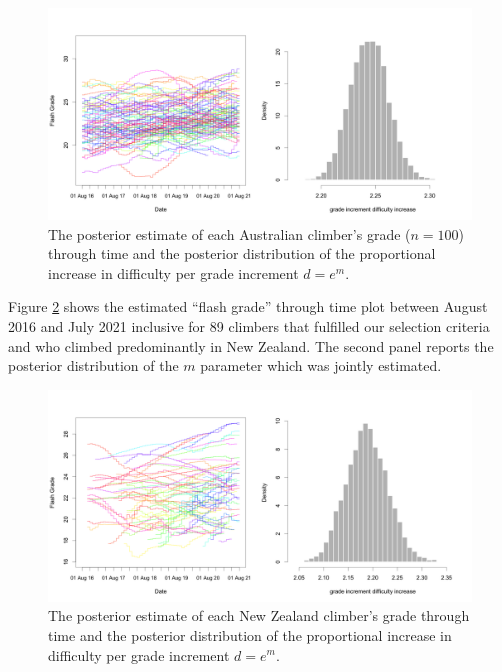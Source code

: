 \documentclass[11pt]{article}
\begin{document}
\begin{figure}
\centering
\includegraphics[width=\textwidth]{figures/aus/ascents-from-2016-08-01-to-2021-08-01-minAscents30-minFails1-Sport-AU-posterior.png}
\caption{\small The posterior estimate of each Australian climber's grade ($n=100$) through time and the posterior distribution of the proportional increase in difficulty per grade increment $d = e^m$.}
\label{aus_ascents_by_attempt}
\end{figure}

Figure \ref{nz_ascents_by_attempt} shows the estimated ``flash grade'' through time plot between August 2016 and July 2021 inclusive for 89 climbers that fulfilled our selection criteria and who climbed predominantly in New Zealand. The second panel reports the posterior distribution of the $m$ parameter which was jointly estimated.


\begin{figure}
\centering
\includegraphics[width=\textwidth]{figures/nz/ascents-from-2016-08-01-to-2021-08-01-minAscents30-minFails1-Sport-AU-posterior.png}
\caption{\small The posterior estimate of each New Zealand climber's grade through time and the posterior distribution of the proportional increase in difficulty per grade increment $d = e^m$.}
\label{nz_ascents_by_attempt}
\end{figure}
\end{document}
